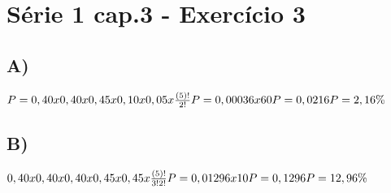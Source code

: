 \section*{Série 1 cap.3 - Exercício 3}

    \subsection*{A)}
    $P = 0,40 x 0,40 x 0,45 x 0,10 x 0,05 x \frac{(5)!}{2!}
    \newline
    P = 0,00036 x 60
    \newline
    P = 0,0216 
    \newline
    P = 2,16\%$
    
    \subsection*{B)}
    $0,40 x 0,40 x 0,40 x 0,45 x 0,45 x \frac{(5)!}{3!2!}
    \newline
    P = 0,01296 x 10
    \newline
    P = 0,1296
    \newline
    P = 12,96\%$

